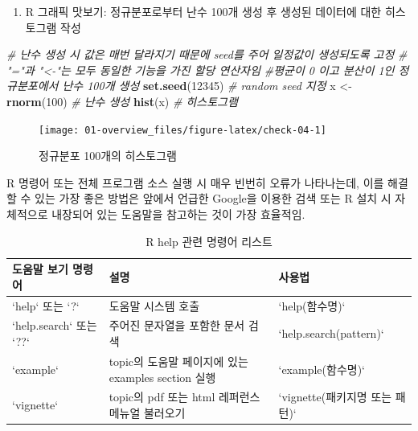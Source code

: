 \documentclass[
  11pt,
]{krantz}
\newenvironment{Shaded}{\begin{snugshade}}{\end{snugshade}}
\newcommand{\CommentTok}[1]{\textcolor[rgb]{0.37,0.37,0.37}{\textit{#1}}}
\newcommand{\DecValTok}[1]{\textcolor[rgb]{0.06,0.06,0.06}{#1}}
\newcommand{\KeywordTok}[1]{\textcolor[rgb]{0.27,0.27,0.27}{\textbf{#1}}}
\newcommand{\NormalTok}[1]{#1}
\newcommand{\StringTok}[1]{\textcolor[rgb]{0.5,0.5,0.5}{#1}}
\providecommand{\tightlist}{%
  \setlength{\itemsep}{0pt}\setlength{\parskip}{0pt}}
\let\BeginKnitrBlock\begin \let\EndKnitrBlock\end
\begin{document}
\normalsize

\begin{enumerate}
\def\labelenumi{\arabic{enumi}.}
\setcounter{enumi}{4}
\tightlist
\item
  R 그래픽 맛보기: 정규분포로부터 난수 100개 생성 후 생성된 데이터에 대한 히스토그램 작성
\end{enumerate}

\footnotesize

\begin{Shaded}
\begin{Highlighting}[]
\CommentTok{# 난수 생성 시 값은 매번 달라지기 때문에 seed를 주어 일정값이 생성되도록 고정}
\CommentTok{# "="과 "<-"는 모두 동일한 기능을 가진 할당 연산자임}
\CommentTok{#평균이 0 이고 분산이 1인 정규분포에서 난수 100개 생성}
\KeywordTok{set.seed}\NormalTok{(}\DecValTok{12345}\NormalTok{) }\CommentTok{# random seed 지정}
\NormalTok{x <-}\StringTok{ }\KeywordTok{rnorm}\NormalTok{(}\DecValTok{100}\NormalTok{) }\CommentTok{# 난수 생성}
\KeywordTok{hist}\NormalTok{(x) }\CommentTok{# 히스토그램}
\end{Highlighting}
\end{Shaded}

\begin{figure}

{\centering \texttt{[image: 01-overview\_files/figure-latex/check-04-1]} 

}

\caption{정규분포 100개의 히스토그램}\label{fig:check-04}
\end{figure}

\normalsize

\footnotesize

\BeginKnitrBlock{rmdtip}
R 명령어 또는 전체 프로그램 소스 실행 시 매우 빈번히 오류가 나타나는데, 이를 해결할 수 있는 가장 좋은 방법은 앞에서 언급한 Google을 이용한 검색 또는 R 설치 시 자체적으로 내장되어 있는 도움말을 참고하는 것이 가장 효율적임.
\EndKnitrBlock{rmdtip}

\normalsize

\footnotesize

\begin{table}[H]

\caption{\label{tab:tab-help}R help 관련 명령어 리스트}
\centering
\fontsize{10}{12}\selectfont
\begin{tabular}[t]{l>{\raggedright\arraybackslash}p{5cm}l}
\toprule
도움말 보기 명령어 & 설명 & 사용법\\
\midrule
\rowcolor{gray!6}  `help` 또는 `?` & 도움말 시스템 호출 & `help(함수명)`\\
`help.search` 또는 `??` & 주어진 문자열을 포함한 문서 검색 & `help.search(pattern)`\\
\rowcolor{gray!6}  `example` & topic의 도움말 페이지에 있는 examples section 실행 & `example(함수명)`\\
`vignette` & topic의 pdf 또는 html 레퍼런스 메뉴얼 불러오기 & `vignette(패키지명 또는 패턴)`\\
\bottomrule
\end{tabular}
\end{table}
\end{document}
